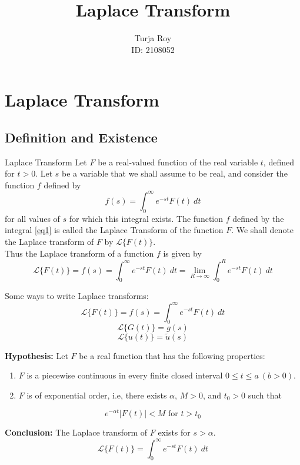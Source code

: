 \documentclass[12pt]{article}
\title{
    \textbf{Laplace Transform}
}
\author{
    Turja Roy\\
    ID: 2108052
}
\date{}
\newcommand{\Lap}{\mathscr{L}}
\begin{document}
\maketitle
\tableofcontents
\newpage


\section{Laplace Transform}


\subsection{Definition and Existence}

\begin{definition}{Laplace Transform}{}
    Let $F$ be a real-valued function of the real variable $t$, defined for $t>0$. Let $s$ be a variable that we shall assume to be real, and consider the function $f$ defined by
    \begin{equation} \label{eq1}
        f(s) = \int_{0}^{\infty} {e^{-st} F(t)} \: d{t} 
    \end{equation}
    for all values of $s$ for which this integral exists. The function $f$ defined by the integral \eqref{eq1} is called the Laplace Transform of the function $F$. We shall denote the Laplace transform of $F$ by $\Lap\{F(t)\}$.\\
    Thus the Laplace transform of a function $f$ is given by
    \begin{equation} \label{eq2}
        \Lap\{ F(t) \} = f(s) = \int_{0}^{\infty} {e^{-st} F(t)} \: d{t}  = \lim_{R \to \infty} \int_{0}^{R} {e^{-st} F(t)} \: d{t} 
    \end{equation}
\end{definition}

Some ways to write Laplace transforms:\\
\[ \Lap\{F(t)\} = f(s) = \int_{0}^{\infty} { e^{-st} F(t) } \: d{t} \]
\[ \Lap\{G(t)\} = g(s) \]
\[ \Lap\{u(t)\} = \tilde{u}(s) \]

\vspace{30pt}
\begin{theorem}{}{}
    \textbf{Hypothesis: } Let $F$ be a real function that has the following properties:
    \begin{enumerate}
        \item $F$ is a piecewise continuous in every finite closed interval $0 \le t \le a \: (b>0)$.
        \item $F$ is of exponential order, i.e, there exists $\alpha$, $M>0$, and $t_0>0$ such that
    \end{enumerate}
    \[ e^{-\alpha t}|F(t)| < M \text{ for } t>t_0 \]
    
    \textbf{Conclusion: } The Laplace transform of $F$ exists for $s>\alpha$.
    \[
        \Lap \{ F(t) \} = \int_{0}^{\infty} {e^{-s t}F(t)} \: d{t}
    \] 
\end{theorem}
\end{document}

